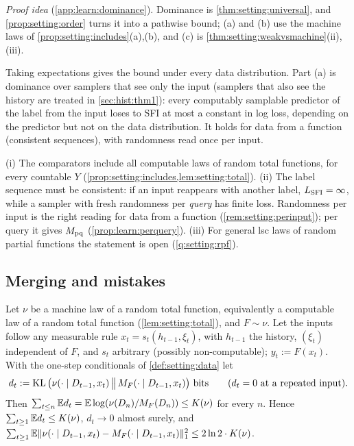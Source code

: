 \emph{Proof idea} (\cref{app:learn:dominance}). Dominance is \cref{thm:setting:universal}, and \cref{prop:setting:order} turns it into a pathwise bound; (a) and (b) use the machine laws of \cref{prop:setting:includes}(a),(b), and (c) is \cref{thm:setting:weakvsmachine}(ii),(iii).

Taking expectations gives the bound under every data distribution. Part (a) is dominance over samplers that see only the input (samplers that also see the history are treated in \cref{sec:hist:thm1}): every computably samplable predictor of the label from the input loses to SFI at most a constant in log loss, depending on the predictor but not on the data distribution. It holds for data from a function (consistent sequences), with randomness read once per input.

\begin{remark}\label{rem:learn:h2}
(i) The comparators include all computable laws of random total functions, for every countable $Y$ (\cref{prop:setting:includes,lem:setting:total}).
(ii) The label sequence must be consistent: if an input reappears with another label, $L_{\mathrm{SFI}}=\infty$, while a sampler with fresh randomness per \emph{query} has finite loss. Randomness per input is the right reading for data from a function (\cref{rem:setting:perinput}); per query it gives $M_{\mathrm{pq}}$ (\cref{prop:learn:perquery}).
(iii) For general lsc laws of random partial functions the statement is open (\cref{q:setting:rpf}).
\end{remark}

\subsection{Merging and mistakes}\label{sec:learn:merging}

\begin{theorem}[merging]\label{thm:learn:merging}
Let $\nu$ be a machine law of a random total function, equivalently a computable law of a random total function (\cref{lem:setting:total}), and $F\sim\nu$. Let the inputs follow any measurable rule $x_t=s_t(h_{t-1},\xi_t)$, with $h_{t-1}$ the history, $(\xi_t)$ independent of $F$, and $s_t$ arbitrary (possibly non-computable); $y_t:=F(x_t)$. With the one-step conditionals of \cref{def:setting:data} let
\[ d_t:=\KL\big(\nu(\cdot\mid D_{t-1},x_t)\,\big\|\,\MF(\cdot\mid D_{t-1},x_t)\big)\ \text{bits}\qquad(d_t=0\text{ at a repeated input}). \]
Then $\sum_{t\le n}\mathbb{E} d_t=\mathbb{E}\log(\nu(D_n)/M_{F}(D_n))\le K(\nu)$ for every $n$. Hence $\sum_{t\ge1}\mathbb{E} d_t\le K(\nu)$, $d_t\to0$ almost surely, and $\sum_{t\ge1}\mathbb{E}\|\nu(\cdot\mid D_{t-1},x_t)-M_{F}(\cdot\mid D_{t-1},x_t)\|_1^2\le2\ln2\cdot K(\nu)$.
\end{theorem}

